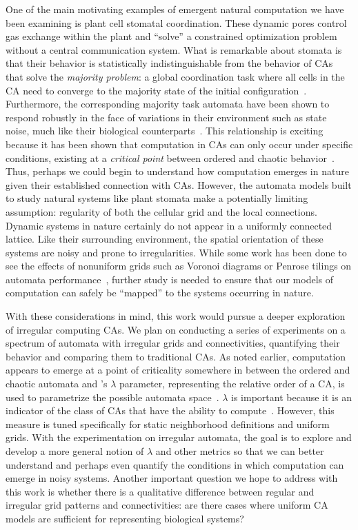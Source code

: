 \documentclass[a4paper,11pt,twoside]{report}
\begin{document}
One of the main motivating examples of emergent natural computation we have been examining is plant cell stomatal coordination. These dynamic pores control gas exchange within the plant and ``solve'' a constrained optimization problem without a central communication system. What is remarkable about stomata is that their behavior is statistically indistinguishable from the behavior of CAs that solve the \textit{majority problem}: a global coordination task where all cells in the CA need to converge to the majority state of the initial  configuration~\cite{mo07,pe04, we11}. Furthermore, the corresponding majority task automata have been shown to respond robustly in the face of variations in their environment such as state noise, much like their biological counterparts~\cite{me07}. This relationship is exciting because it has been shown that computation in CAs can only occur under specific conditions, existing at a \textit{critical point} between ordered and chaotic behavior~\cite{la90, wf86}. Thus, perhaps we could begin to understand how computation emerges in nature given their established connection with CAs. However, the automata models built to study natural systems like plant stomata make a potentially limiting assumption: regularity of both the cellular grid and the local connections. Dynamic systems in nature certainly do not appear in a uniformly connected lattice. Like their surrounding environment, the spatial orientation of these systems are noisy and prone to irregularities. While some work has been done to see the effects of nonuniform grids such as Voronoi diagrams or Penrose tilings on automata performance~\cite{ca06,fl01,hi05}, further study is needed to ensure that our models of computation can safely be ``mapped'' to the systems occurring in nature.

With these considerations in mind, this work would pursue a deeper exploration of irregular computing CAs. We plan on conducting a series of experiments on a spectrum of automata with irregular grids and connectivities, quantifying their behavior and comparing them to traditional CAs. As noted earlier, computation appears to emerge at a point of criticality somewhere in between the ordered and chaotic automata and \citeauthor{la90}'s $\lambda$ parameter, representing the relative order of a CA, is used to parametrize the possible automata space~\cite{la90}. $\lambda$ is important because it is an indicator of the class of CAs that have the ability to compute~\cite{wo90}. However, this measure is tuned specifically for static neighborhood definitions and uniform grids. With the experimentation on irregular automata, the goal is to explore and develop a more general notion of $\lambda$ and other metrics so that we can better understand and perhaps even quantify the conditions in which computation can emerge in noisy systems. Another important question we hope to address with this work is whether there is a qualitative difference between regular and irregular grid patterns and connectivities: are there cases where uniform CA models are sufficient for representing biological systems? 
\end{document}
